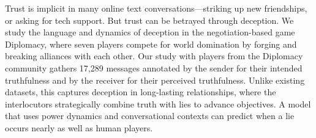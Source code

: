 Trust is implicit in many online text conversations---striking up new friendships, or asking for tech support.  But trust can be betrayed through deception.  We study the language and dynamics of deception in the negotiation-based game Diplomacy, where seven players compete for world domination by forging and breaking alliances with each other.  Our study with players from the Diplomacy community gathers 17,289 messages annotated by the sender for their intended truthfulness and by the receiver for their perceived truthfulness. Unlike existing datasets, this captures deception in long-lasting relationships, where the interlocutors strategically combine truth with lies to advance objectives. A model that uses power dynamics and conversational contexts can predict when a lie occurs nearly as well as human players.
